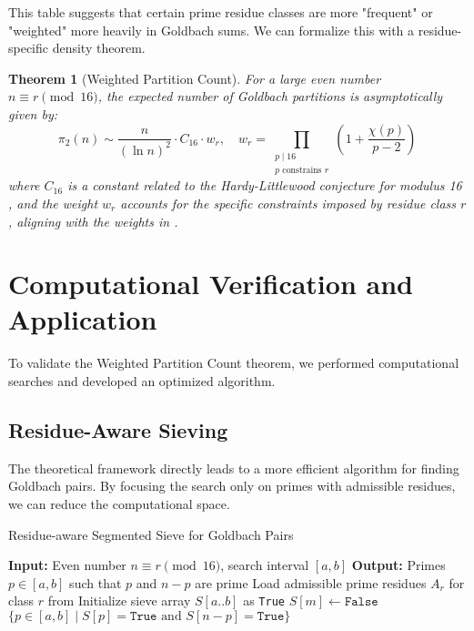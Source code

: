 \documentclass[12pt]{article}
\newtheorem{theorem}{Theorem}[section]
\begin{document}
	This table suggests that certain prime residue classes are more "frequent" or "weighted" more heavily in Goldbach sums. We can formalize this with a residue-specific density theorem.
	
	\begin{theorem}[Weighted Partition Count]\label{thm:weighted}
		For a large even number $n \equiv r \pmod{16}$, the expected number of Goldbach partitions is asymptotically given by:
		\[
		\pi_2(n) \sim \frac{n}{(\ln n)^2} \cdot C_{16} \cdot w_r, \quad 
		w_r = \prod_{\substack{p \mid 16 \\ p \text{ constrains } r}} \left(1 + \frac{\chi(p)}{p-2}\right)
		\]
		where $C_{16}$ is a constant related to the Hardy-Littlewood conjecture for modulus 16 , and the weight $w_r$ accounts for the specific constraints imposed by residue class $r$, aligning with the weights in  .
	\end{theorem}
	
	\section{Computational Verification and Application}
	
	To validate the Weighted Partition Count theorem, we performed computational searches and developed an optimized algorithm.
	
	\subsection{Residue-Aware Sieving}
	
	The theoretical framework directly leads to a more efficient algorithm for finding Goldbach pairs. By focusing the search only on primes with admissible residues, we can reduce the computational space.
	
	\begin{algorithm}[H]
		\caption{Residue-aware Segmented Sieve for Goldbach Pairs}
		\label{alg:sieve}
		\begin{algorithmic}[1]
			\State \textbf{Input:} Even number \(n \equiv r \pmod{16}\), search interval \([a, b]\)
			\State \textbf{Output:} Primes \(p \in [a, b]\) such that $p$ and $n-p$ are prime
			\State Load admissible prime residues \(A_r\) for class $r$ from  
			\State Initialize sieve array \(S[a..b]\) as \texttt{True}
			  
			\State \(S[m] \gets \texttt{False}\)
			\EndIf
			\EndFor
			\EndFor
			\State \Return \(\{p \in [a, b] \mid S[p] = \texttt{True} \text{ and } S[n-p] = \texttt{True} \}\)
		\end{algorithmic}
	\end{algorithm}
	
\end{document}
